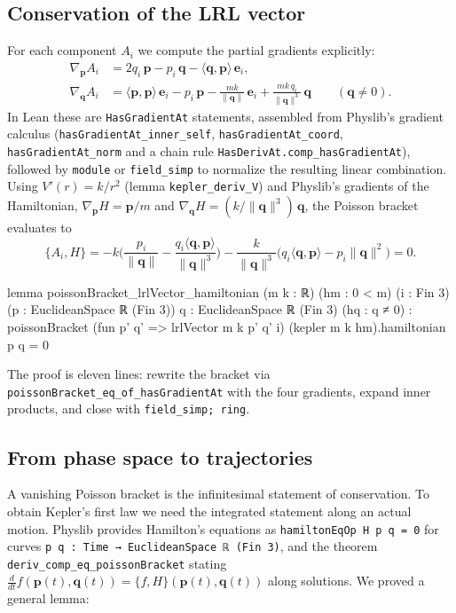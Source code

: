 \documentclass[11pt]{article}
\theoremstyle{definition}
\theoremstyle{remark}
\newcommand{\vp}{\mathbf{p}}
\newcommand{\vq}{\mathbf{q}}
\newcommand{\ip}[2]{\langle #1, #2\rangle}
\begin{document}
\subsection{Conservation of the LRL vector}\label{sec:conservation}

For each component $A_i$ we compute the partial gradients explicitly:
\begin{align*}
  \nabla_{\vp}A_i &= 2q_i\,\vp-p_i\,\vq-\ip{\vq}{\vp}\,\mathbf e_i,\\
  \nabla_{\vq}A_i &= \ip{\vp}{\vp}\,\mathbf e_i-p_i\,\vp-\frac{mk}{\|\vq\|}\,\mathbf e_i
     +\frac{mk\,q_i}{\|\vq\|^3}\,\vq \qquad(\vq\neq0).
\end{align*}
In Lean these are \texttt{HasGradientAt} statements, assembled from Physlib's gradient calculus
(\texttt{hasGradientAt\_inner\_self}, \texttt{hasGradientAt\_coord}, \texttt{hasGradientAt\_norm}
and a chain rule \texttt{HasDerivAt.comp\_hasGradientAt}), followed by \texttt{module} or
\texttt{field\_simp} to normalize the resulting linear combination. Using
$V'(r)=k/r^2$ (lemma \texttt{kepler\_deriv\_V}) and Physlib's gradients of the Hamiltonian,
$\nabla_{\vp}H=\vp/m$ and $\nabla_{\vq}H=(k/\|\vq\|^3)\,\vq$, the Poisson bracket evaluates to
\[
  \{A_i,H\}=-k\Big(\frac{p_i}{\|\vq\|}-\frac{q_i\ip{\vq}{\vp}}{\|\vq\|^3}\Big)
  -\frac{k}{\|\vq\|^3}\big(q_i\ip{\vq}{\vp}-p_i\|\vq\|^2\big)=0 .
\]

\begin{lean}
lemma poissonBracket_lrlVector_hamiltonian (m k : ℝ) (hm : 0 < m) (i : Fin 3)
    (p : EuclideanSpace ℝ (Fin 3)) {q : EuclideanSpace ℝ (Fin 3)} (hq : q ≠ 0) :
    poissonBracket (fun p' q' => lrlVector m k p' q' i)
      (kepler m k hm).hamiltonian p q = 0
\end{lean}

The proof is eleven lines: rewrite the bracket via \texttt{poissonBracket\_eq\_of\_hasGradientAt}
with the four gradients, expand inner products, and close with \texttt{field\_simp; ring}.

\subsection{From phase space to trajectories}\label{sec:trajectory}

A vanishing Poisson bracket is the infinitesimal statement of conservation. To obtain Kepler's
first law we need the integrated statement along an actual motion. Physlib provides Hamilton's
equations as \texttt{hamiltonEqOp H p q = 0} for curves \texttt{p q : Time → EuclideanSpace ℝ (Fin 3)},
and the theorem \texttt{deriv\_comp\_eq\_poissonBracket} stating
$\frac{d}{dt}f(\vp(t),\vq(t))=\{f,H\}(\vp(t),\vq(t))$ along solutions. We proved a general lemma:
\end{document}
